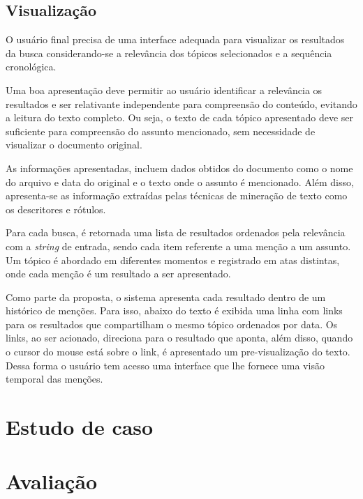 
\subsection{Visualização}

O usuário final precisa de uma interface adequada para visualizar os resultados da busca considerando-se a relevância dos tópicos selecionados e a sequência cronológica.

Uma boa apresentação deve permitir ao usuário identificar a relevância os resultados e ser relativante independente para compreensão do conteúdo, evitando a leitura do texto completo. Ou seja, o texto de cada tópico apresentado deve ser suficiente para compreensão do assunto mencionado, sem necessidade de visualizar o documento original.

As informações apresentadas, incluem dados obtidos do documento como o nome do arquivo e data do original e o texto onde o assunto é mencionado. Além disso, apresenta-se as informação extraídas pelas técnicas de mineração de texto como os descritores e rótulos.


Para cada busca, é retornada uma lista de resultados ordenados pela relevância com a \textit{string} de entrada, sendo cada item referente a uma menção a um assunto. Um tópico é abordado em diferentes momentos e registrado em atas distintas, onde cada menção é um resultado a ser apresentado. 

Como parte da proposta, o sistema apresenta cada resultado dentro de um histórico de menções. Para isso, abaixo do texto é exibida uma linha com links para os resultados que compartilham o mesmo tópico ordenados por data. Os links, ao ser acionado, direciona para o resultado que aponta, além disso, quando o cursor do mouse está sobre o link, é apresentado um pre-visualização do texto. Dessa forma o usuário tem acesso uma interface que lhe fornece uma visão temporal das menções.





\section{Estudo de caso}


\section{Avaliação}

